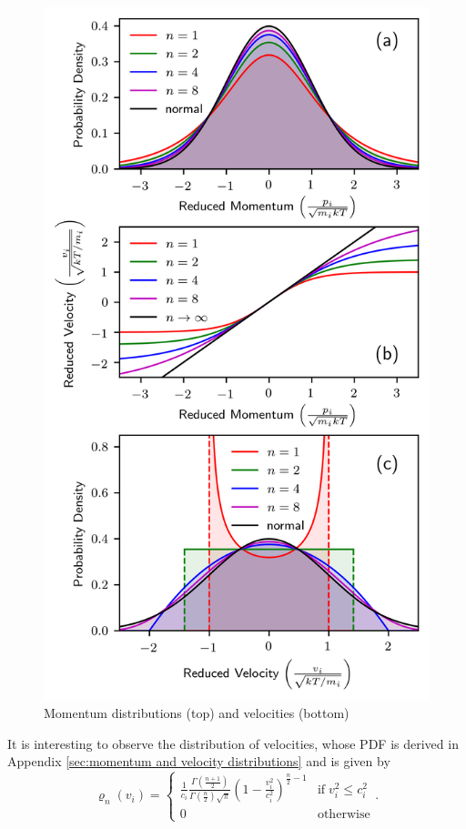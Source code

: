 \documentclass[
aip,
jcp,
reprint,
]{revtex4-1}
\newcommand{\figscale}{0.8}
\newcommand{\nn}{n}
\begin{document}
\begin{figure}[htbp!]
	\centering
	\includegraphics[scale=\figscale]{momentum_and_velocity_functions}
	\caption{Momentum distributions (top) and velocities (bottom)}
	\label{fig:momentum and velocity functions}
\end{figure}

It is interesting to observe the distribution of velocities, whose PDF is derived in Appendix \ref{sec:momentum and velocity distributions} and is given by
\begin{equation*}
\varrho_\nn(v_i) = \begin{cases}
\frac{1}{c_i} \frac{\Gamma\left(\frac{\nn+1}{2}\right)}{\Gamma\left(\frac{\nn}{2}\right) \sqrt{\pi}} \left(1-\frac{v_i^2}{c_i^2}\right)^{\frac{\nn}{2}-1} & \mathrm{if} \; v_i^2 \leq c_i^2 \\
0 & \mathrm{otherwise}
\end{cases}.
\end{equation*}
\end{document}
